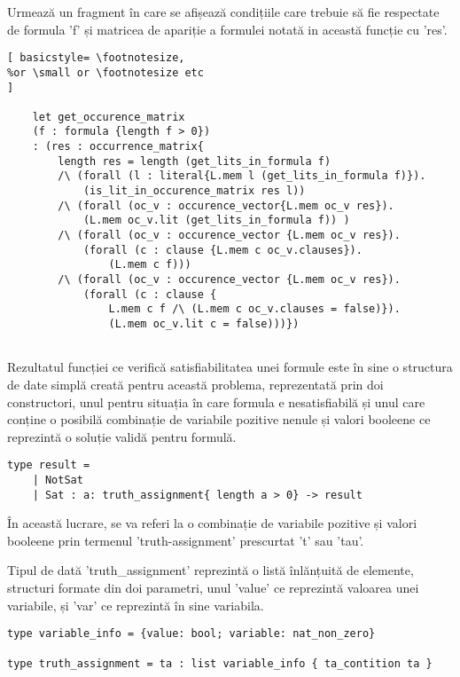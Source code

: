 Urmează un fragment în care se afișează condițiile care trebuie să fie respectate de formula 'f' și matricea de apariție a formulei notată in această funcție cu 'res'.

\begin{lstlisting}[	basicstyle= \footnotesize, 
%or \small or \footnotesize etc
]
	
	let get_occurence_matrix 
	(f : formula {length f > 0}) 
	: (res : occurrence_matrix{
		length res = length (get_lits_in_formula f)
		/\ (forall (l : literal{L.mem l (get_lits_in_formula f)}). 
			(is_lit_in_occurence_matrix res l))
		/\ (forall (oc_v : occurence_vector{L.mem oc_v res}). 	
			(L.mem oc_v.lit (get_lits_in_formula f)) )
		/\ (forall (oc_v : occurence_vector {L.mem oc_v res}). 
			(forall (c : clause {L.mem c oc_v.clauses}). 
				(L.mem c f)))
		/\ (forall (oc_v : occurence_vector {L.mem oc_v res}). 
			(forall (c : clause {
				L.mem c f /\ (L.mem c oc_v.clauses = false)}). 
				(L.mem oc_v.lit c = false)))})
	
\end{lstlisting}

Rezultatul funcției ce verifică satisfiabilitatea unei formule este în sine o structura de date simplă creată pentru această problema, reprezentată prin doi constructori, unul pentru situația în care formula e nesatisfiabilă și unul care conține o posibilă combinație de variabile pozitive nenule și valori booleene ce reprezintă o soluție validă pentru formulă. 

\newpage
\begin{lstlisting}[]
type result =
	| NotSat
	| Sat : a: truth_assignment{ length a > 0} -> result

\end{lstlisting}

În această lucrare, se va referi la o combinație de variabile pozitive și valori \newline booleene prin termenul 'truth-assignment' prescurtat 't' sau 'tau'.

Tipul de dată 'truth\_assignment' reprezintă o listă înlănțuită de elemente, structuri formate din doi parametri, unul 'value' ce reprezintă valoarea unei variabile, și 'var' ce reprezintă în sine variabila.

\begin{lstlisting}[]
type variable_info = {value: bool; variable: nat_non_zero}

type truth_assignment = ta : list variable_info { ta_contition ta }
\end{lstlisting}

